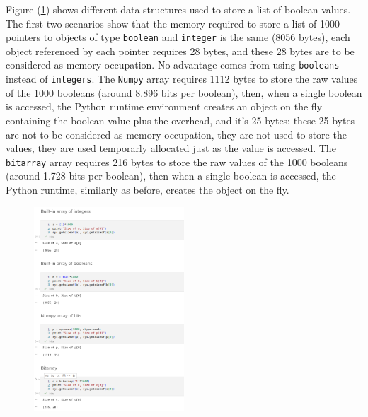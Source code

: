 \documentclass{beamer}
\begin{document}
\begin{frame}{}
    Figure (\ref{fig:mem_array}) shows different data structures used to store a list of boolean values.
    The first two scenarios show that the memory required to store a list of
    1000 pointers to objects of type \texttt{boolean} and \texttt{integer} is 
    the same (8056 bytes), each object referenced by each pointer requires 28 bytes,
    and these 28 bytes are to be considered as memory occupation.
    No advantage comes from using \texttt{booleans} instead of \texttt{integers}.
    The \texttt{Numpy} array requires 1112 bytes to store the raw values of 
    the 1000 booleans (around 8.896 bits per boolean), then, when a single boolean
    is accessed, the Python runtime environment creates an object on the 
    fly containing the
    boolean value plus the overhead, and it's 25 bytes: these 25 bytes are not
    to be considered as memory occupation, they are not used to store
    the values, they are used temporarly allocated just as the value is accessed.
    The \texttt{bitarray} array requires 216 bytes to store the raw values of
    the 1000 booleans (around 1.728 bits per boolean), then when a single boolean
    is accessed, the Python runtime, similarly as before, creates the object on the fly.
\end{frame}

\begin{frame}
        \begin{figure}
            \centering
            \includegraphics[width=0.5\textwidth]{mem_array.png}
            \label{fig:mem_array}
        \end{figure}
\end{frame}
\end{document}
